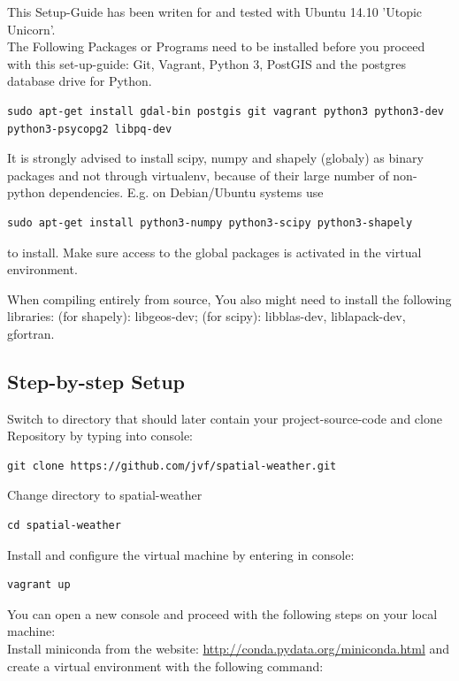 \documentclass[paper=a4, fontsize=11pt]{article} %
\numberwithin{equation}{section} %
\numberwithin{figure}{section} %
\numberwithin{table}{section} %
\begin{document}
This Setup-Guide has been writen for and tested with Ubuntu 14.10 'Utopic Unicorn'.\\
The Following Packages or Programs need to be installed before you proceed with this set-up-guide: Git, Vagrant, Python 3, PostGIS and the postgres database drive for Python.

\begin{lstlisting}
sudo apt-get install gdal-bin postgis git vagrant python3 python3-dev python3-psycopg2 libpq-dev
\end{lstlisting}

It is strongly advised to install scipy, numpy and shapely (globaly) as
binary packages and not through virtualenv, because of their large
number of non-python dependencies. E.g. on Debian/Ubuntu systems use
\begin{lstlisting}
sudo apt-get install python3-numpy python3-scipy python3-shapely
\end{lstlisting}
to install. Make sure access to the global packages is activated in the
virtual environment.

When compiling entirely from source, You also might need to install the
following libraries: (for shapely): libgeos-dev; (for scipy):
libblas-dev, liblapack-dev, gfortran.

\subsection{Step-by-step Setup}
Switch to directory that should later contain your project-source-code and clone Repository by typing into console:
\begin{lstlisting}
git clone https://github.com/jvf/spatial-weather.git
\end{lstlisting}

Change directory to spatial-weather
\begin{lstlisting}
cd spatial-weather
\end{lstlisting}

Install and configure the virtual machine by entering in console:
\begin{lstlisting}
vagrant up
\end{lstlisting}

You can open a new console and proceed with the following steps on your local machine:\\
Install miniconda from the website:
\url{http://conda.pydata.org/miniconda.html} and create a virtual environment with the following command:
\end{document}
